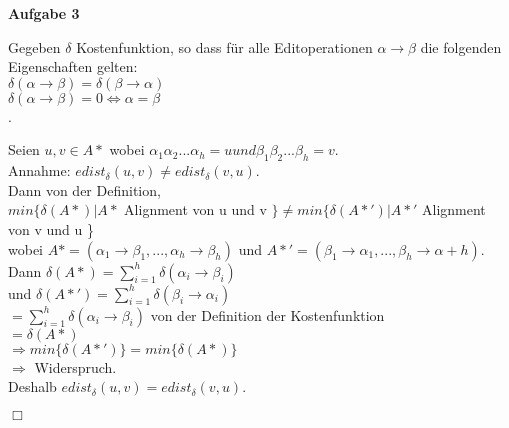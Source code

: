 \documentclass[11pt,a4paper]{article}
\begin{document}
\noindent \textbf{Aufgabe 3} \\

\vspace{0.66cm}



\noindent Gegeben $ \delta $ Kostenfunktion, so dass f\"{u}r alle Editoperationen $ \alpha \to \beta $ die folgenden Eigenschaften gelten: \\
\indent \indent $ \delta (\alpha \to \beta) = \delta(\beta \to \alpha) $ \\
\indent \indent $ \delta(\alpha \to \beta) = 0 \Leftrightarrow \alpha = \beta $ \\


.

\doublespace
\noindent Seien $ u, v \in A* $ wobei $ \alpha_1\alpha_2...\alpha_h = u und \beta_1\beta_2...\beta_h = v. $ \\
Annahme: $ edist_\delta(u,v) \ne edist_\delta(v,u). $ \\

Dann von der Definition, \\
\indent \indent $ min\{\delta(A*) | A* $ Alignment von u und v $ \} \ne min\{\delta(A*') | A*' $ Alignment von v und u \} \\
\indent \indent wobei $ A* = (\alpha_1 \to \beta_1, ... , \alpha_h \to \beta_h) $ 
und $ A*' = (\beta_1 \to \alpha_1, ... ,\beta_h \to \alpha+h). $ \\

Dann $ \delta(A*) = \sum_{i=1}^{h}  \delta(\alpha_i \to \beta_i) $ \\
\indent \indent und $  \delta(A*') = \sum_{i=1}^{h}  \delta(\beta_i \to \alpha_i) $ \\
\indent \indent \indent \indent \indent $ = \sum_{i=1}^{h}  \delta(\alpha_i \to \beta_i) $ von der Definition der Kostenfunktion \\
\indent \indent \indent \indent \indent $ = \delta(A*) $ \\
\indent \indent $ \Rightarrow min\{\delta(A*')\} = min\{\delta(A*)\} $ \\
\indent \indent $ \Rightarrow $ Widerspruch. \\

Deshalb $ edist_\delta(u,v) = edist_\delta(v,u). $ \\
 \par{\raggedright\texttt{}}
\hfill $  \Box $\\
\end{document}
